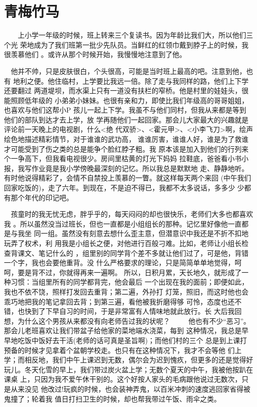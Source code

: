 \documentclass[12pt]{book}
\begin{document}
\section{青梅竹马}
\label{sec-1-3}

　　上小学一年级的时候，班上转来三个复读书。因为年龄比我们大，所以他们三个光
荣地成为了我们班第一批少先队员。当鲜红的红领巾戴到脖子上的时候，我很羡慕他们
。或许从那个时候开始，我慢慢地注意到了他。

    　他并不帅，只是皮肤很白，个头很高，可能是当时班上最高的吧。注意到他，也有
地利之便。他住临村，上学要比我远一倍。除了走与我同样的路，他们上下学还要翻过
两道堤坝，而水渠上只有一道没有扶栏的窄桥。他是村里的娃娃头，很能照顾低年级的
小弟弟小妹妹。也很有亲和力，即使比我们年级高的哥哥姐姐，也喜欢与他们这帮小P
孩儿一起上下学。我虽不与他们同村，但我从来都是等到他们的部队到达才去上学，放
学再随他们一起回家。那会儿大家最大的兴趣就是评论前一天晚上的电视剧，什么<绝
代双骄>、<霍元甲>、<小李飞刀>啊，绘声绘色地描述精彩情节，对于谁谁的武功高，
谁谁厉害，谁谁人好，谁是为了救谁才可能受到了伤之类的总是能争个脸红脖子粗。我
原本该是加入到他们的行列来个一争高下，但我看电视很少。房间里枯黄的灯光下妈妈
拉鞋底，爸爸看小书小报，我写作业竟是我小学傍晚最深刻的记忆。所以我总是默默地
走、静静地听。有时他说得精彩了，会情不自禁投上羡慕的一瞥。就这样每天两个来回
(中午我们回家吃饭的)，走了六年。到现在，不是迫不得已，我都不太多说话，多多少
少都有那个年代的印记吧。

    　孩童时的我无忧无虑，胖乎乎的，每天闷闷的却也很快乐，老师们大多也都喜欢我
。所以虽然没当过班长，但也一直都是小组组长的那种。记忆里好像他一直都是与我坐
同一组。虽然没有刻意去想什么歪主意，但潜意识中我还是不折不扣地玩弄了权术，利
用我是小组长之便，对他进行百般刁难。比如，老师让小组长检查背课文、笔记什么的
，组里别的同学背个差不多就让他们过了，可是他，背错一个字，我也会要他重背。没
什么严格要求的理论，只是简简单单地觉得，呵呵，要是背不过，你就得再来一遍啊。
所以，日积月累，天长地久，就形成了一种习惯：当组里所有的同学都背完，他会最后
一个出现在我的面前；即便如此，我也不依不饶，照样打发回去重背；第二遍，外孙打
灯笼，照旧，而这时他也会乖巧地把我的笔记拿回去背；到第三遍，看他被我折磨得够
可怜，态度也还不错，也快到了下早自习的时间，于是非常富有人情味地就此放行。长
大后我回想，为什么这个男孩从来都没有向老师告过我的状呢？
　
    　他也有不少“恶习”。那会儿老班喜欢让我们带盆子给他家的菜地端水浇菜，每到
这种情况，我总是早早地吃饭中饭好去干活(老师的话可真是圣旨啊)；而他们村的三个
总是到上课打预备的时候才见拿着个盆朝学校走。也只有在这种情况下，我才不会等他
们上学；而相反地，我们中午上课迟到无数，偶尔会为迟到愧疚，但更多的还是觉得好
玩儿。冬天化雪的早上，我们带过炭火盆上学；无数个夏天的中午，我被他按趴在课桌
上，只因为我不爱午休干别的。这个好按人家头的毛病跟他说过无数次，只是从来没见
他改过!玩疯的时候，也会装神弄鬼，以百米冲刺的速度逃回家省得被鬼撞了；轮着我
值日打扫卫生的时候，却也帮我带过午饭、雨伞之类。
\end{document}
